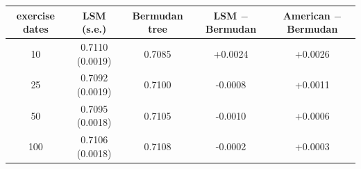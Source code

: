 \begin{tabular}{ccccc}
\toprule
exercise dates & LSM (s.e.) & Bermudan tree & LSM $-$ Bermudan & American $-$ Bermudan \\
\midrule
10 & 0.7110 (0.0019) & 0.7085 & +0.0024 & +0.0026 \\
25 & 0.7092 (0.0019) & 0.7100 & -0.0008 & +0.0011 \\
50 & 0.7095 (0.0018) & 0.7105 & -0.0010 & +0.0006 \\
100 & 0.7106 (0.0018) & 0.7108 & -0.0002 & +0.0003 \\
\bottomrule
\end{tabular}
